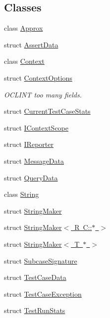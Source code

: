 \subsection*{Classes}
\begin{DoxyCompactItemize}
\item 
class \mbox{\hyperlink{classdoctest_1_1_approx}{Approx}}
\item 
struct \mbox{\hyperlink{structdoctest_1_1_assert_data}{Assert\+Data}}
\item 
class \mbox{\hyperlink{classdoctest_1_1_context}{Context}}
\item 
struct \mbox{\hyperlink{structdoctest_1_1_context_options}{Context\+Options}}
\begin{DoxyCompactList}\small\item\em O\+C\+L\+I\+NT too many fields. \end{DoxyCompactList}\item 
struct \mbox{\hyperlink{structdoctest_1_1_current_test_case_stats}{Current\+Test\+Case\+Stats}}
\item 
struct \mbox{\hyperlink{structdoctest_1_1_i_context_scope}{I\+Context\+Scope}}
\item 
struct \mbox{\hyperlink{structdoctest_1_1_i_reporter}{I\+Reporter}}
\item 
struct \mbox{\hyperlink{structdoctest_1_1_message_data}{Message\+Data}}
\item 
struct \mbox{\hyperlink{structdoctest_1_1_query_data}{Query\+Data}}
\item 
class \mbox{\hyperlink{classdoctest_1_1_string}{String}}
\item 
struct \mbox{\hyperlink{structdoctest_1_1_string_maker}{String\+Maker}}
\item 
struct \mbox{\hyperlink{structdoctest_1_1_string_maker_3_01_r_01_c_1_1_5_01_4}{String\+Maker$<$ R C\+::$\ast$ $>$}}
\item 
struct \mbox{\hyperlink{structdoctest_1_1_string_maker_3_01_t_01_5_01_4}{String\+Maker$<$ T $\ast$ $>$}}
\item 
struct \mbox{\hyperlink{structdoctest_1_1_subcase_signature}{Subcase\+Signature}}
\item 
struct \mbox{\hyperlink{structdoctest_1_1_test_case_data}{Test\+Case\+Data}}
\item 
struct \mbox{\hyperlink{structdoctest_1_1_test_case_exception}{Test\+Case\+Exception}}
\item 
struct \mbox{\hyperlink{structdoctest_1_1_test_run_stats}{Test\+Run\+Stats}}
\end{DoxyCompactItemize}
